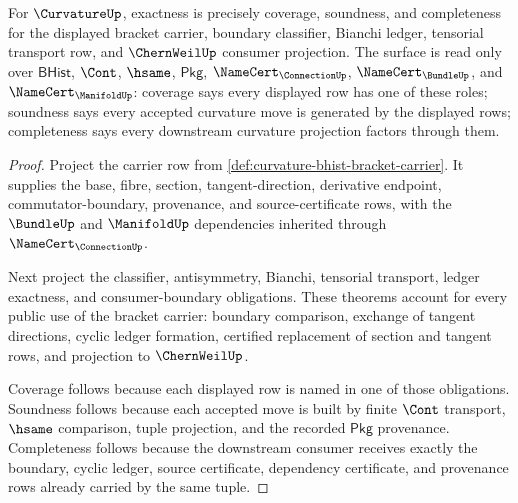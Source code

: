 \begin{theorem}
\label{thm:curvature-exactness-predicate-surface}
For $\CurvatureUp$, exactness is precisely coverage, soundness, and completeness for the displayed bracket carrier, boundary classifier, Bianchi ledger, tensorial transport row, and $\ChernWeilUp$ consumer projection. The surface is read only over $\mathsf{BHist}$, $\Cont$, $\hsame$, $\mathsf{Pkg}$, $\NameCert_{\ConnectionUp}$, $\NameCert_{\BundleUp}$, and $\NameCert_{\ManifoldUp}$: coverage says every displayed row has one of these roles; soundness says every accepted curvature move is generated by the displayed rows; completeness says every downstream curvature projection factors through them.
\end{theorem}
\begin{proof}
Project the carrier row from \autoref{def:curvature-bhist-bracket-carrier}. It supplies the base, fibre, section, tangent-direction, derivative endpoint, commutator-boundary, provenance, and source-certificate rows, with the $\BundleUp$ and $\ManifoldUp$ dependencies inherited through $\NameCert_{\ConnectionUp}$.

Next project the classifier, antisymmetry, Bianchi, tensorial transport, ledger exactness, and consumer-boundary obligations. These theorems account for every public use of the bracket carrier: boundary comparison, exchange of tangent directions, cyclic ledger formation, certified replacement of section and tangent rows, and projection to $\ChernWeilUp$.

Coverage follows because each displayed row is named in one of those obligations. Soundness follows because each accepted move is built by finite $\Cont$ transport, $\hsame$ comparison, tuple projection, and the recorded $\mathsf{Pkg}$ provenance. Completeness follows because the downstream consumer receives exactly the boundary, cyclic ledger, source certificate, dependency certificate, and provenance rows already carried by the same tuple.
\end{proof}

